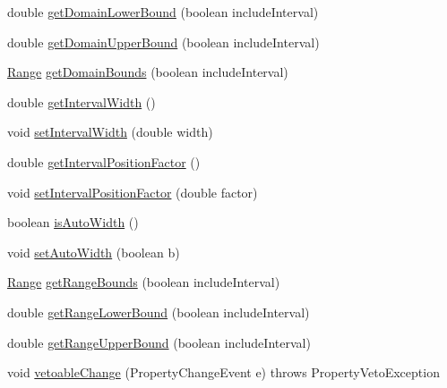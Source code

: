 \begin{DoxyCompactItemize}
\item 
double \mbox{\hyperlink{classorg_1_1jfree_1_1data_1_1xy_1_1_x_y_series_collection_a4830b1dd51af2617e8a5bf80fdcf9aee}{get\+Domain\+Lower\+Bound}} (boolean include\+Interval)
\item 
double \mbox{\hyperlink{classorg_1_1jfree_1_1data_1_1xy_1_1_x_y_series_collection_af943c8f3bbfd29d446a6af8018d9d8b1}{get\+Domain\+Upper\+Bound}} (boolean include\+Interval)
\item 
\mbox{\hyperlink{classorg_1_1jfree_1_1data_1_1_range}{Range}} \mbox{\hyperlink{classorg_1_1jfree_1_1data_1_1xy_1_1_x_y_series_collection_a21ae9645c6f9ed82cdd4f358da48d62b}{get\+Domain\+Bounds}} (boolean include\+Interval)
\item 
double \mbox{\hyperlink{classorg_1_1jfree_1_1data_1_1xy_1_1_x_y_series_collection_a8fd7462bd4c2e7c072532b8e5011879d}{get\+Interval\+Width}} ()
\item 
void \mbox{\hyperlink{classorg_1_1jfree_1_1data_1_1xy_1_1_x_y_series_collection_a17f1eef4b17762e79947aa019f2809d8}{set\+Interval\+Width}} (double width)
\item 
double \mbox{\hyperlink{classorg_1_1jfree_1_1data_1_1xy_1_1_x_y_series_collection_a21f19b8c33a85bd71b79dcea9bb78b3f}{get\+Interval\+Position\+Factor}} ()
\item 
void \mbox{\hyperlink{classorg_1_1jfree_1_1data_1_1xy_1_1_x_y_series_collection_ae75dd5ff3ef476d50cc53a07cd7c97a6}{set\+Interval\+Position\+Factor}} (double factor)
\item 
boolean \mbox{\hyperlink{classorg_1_1jfree_1_1data_1_1xy_1_1_x_y_series_collection_a1dfc251753ab5502bccaa16c07a52fbe}{is\+Auto\+Width}} ()
\item 
void \mbox{\hyperlink{classorg_1_1jfree_1_1data_1_1xy_1_1_x_y_series_collection_a55c279bc4359cce14eb093536141af0d}{set\+Auto\+Width}} (boolean b)
\item 
\mbox{\hyperlink{classorg_1_1jfree_1_1data_1_1_range}{Range}} \mbox{\hyperlink{classorg_1_1jfree_1_1data_1_1xy_1_1_x_y_series_collection_af2e690925c633815d6e33f1b83b5040e}{get\+Range\+Bounds}} (boolean include\+Interval)
\item 
double \mbox{\hyperlink{classorg_1_1jfree_1_1data_1_1xy_1_1_x_y_series_collection_a7ea06c4bfb1643bfabceb59a89d3360f}{get\+Range\+Lower\+Bound}} (boolean include\+Interval)
\item 
double \mbox{\hyperlink{classorg_1_1jfree_1_1data_1_1xy_1_1_x_y_series_collection_a2d165d7e676b4d1350aeabb8b503270f}{get\+Range\+Upper\+Bound}} (boolean include\+Interval)
\item 
void \mbox{\hyperlink{classorg_1_1jfree_1_1data_1_1xy_1_1_x_y_series_collection_acf8f63159b50d5f1c1390997b7977f4c}{vetoable\+Change}} (Property\+Change\+Event e)  throws Property\+Veto\+Exception 
\end{DoxyCompactItemize}
